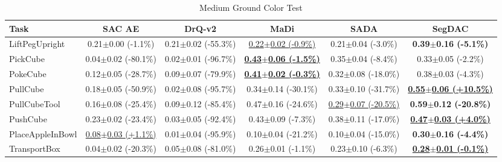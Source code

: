\begin{table}[htbp]
\centering
\scriptsize
\caption{Medium Ground Color Test}
\label{tab:appendix_groundcolortest_medium}
\begin{adjustbox}{max width=\textwidth}
\begin{tabular}{l*{5}{c}}
\toprule
\textbf{Task} & \textbf{SAC AE} & \textbf{DrQ-v2} & \textbf{MaDi} & \textbf{SADA} & \textbf{SegDAC} \\
\midrule
LiftPegUpright & 0.21$\pm$0.00 \scriptsize{(-1.1\%)} & 0.21$\pm$0.02 \scriptsize{(-55.3\%)} & \underline{0.22$\pm$0.02 \scriptsize{(-0.9\%)}} & 0.21$\pm$0.04 \scriptsize{(-3.0\%)} & \textbf{0.39$\pm$0.16 \scriptsize{(-5.1\%)}} \\
PickCube & 0.04$\pm$0.02 \scriptsize{(-80.1\%)} & 0.02$\pm$0.01 \scriptsize{(-96.7\%)} & \textbf{\underline{0.43$\pm$0.06 \scriptsize{(-1.5\%)}}} & 0.35$\pm$0.04 \scriptsize{(-8.4\%)} & 0.33$\pm$0.05 \scriptsize{(-2.2\%)} \\
PokeCube & 0.12$\pm$0.05 \scriptsize{(-28.7\%)} & 0.09$\pm$0.07 \scriptsize{(-79.9\%)} & \textbf{\underline{0.41$\pm$0.02 \scriptsize{(-0.3\%)}}} & 0.32$\pm$0.08 \scriptsize{(-18.0\%)} & 0.38$\pm$0.03 \scriptsize{(-4.3\%)} \\
PullCube & 0.18$\pm$0.05 \scriptsize{(-50.9\%)} & 0.02$\pm$0.08 \scriptsize{(-95.7\%)} & 0.34$\pm$0.14 \scriptsize{(-30.1\%)} & 0.33$\pm$0.10 \scriptsize{(-31.7\%)} & \textbf{\underline{0.55$\pm$0.06 \scriptsize{(+10.5\%)}}} \\
PullCubeTool & 0.16$\pm$0.08 \scriptsize{(-25.4\%)} & 0.09$\pm$0.12 \scriptsize{(-85.4\%)} & 0.47$\pm$0.16 \scriptsize{(-24.6\%)} & \underline{0.29$\pm$0.07 \scriptsize{(-20.5\%)}} & \textbf{0.59$\pm$0.12 \scriptsize{(-20.8\%)}} \\
PushCube & 0.23$\pm$0.02 \scriptsize{(-23.4\%)} & 0.03$\pm$0.05 \scriptsize{(-92.4\%)} & 0.43$\pm$0.09 \scriptsize{(-7.3\%)} & 0.38$\pm$0.11 \scriptsize{(-17.0\%)} & \textbf{\underline{0.47$\pm$0.03 \scriptsize{(+4.0\%)}}} \\
PlaceAppleInBowl & \underline{0.08$\pm$0.03 \scriptsize{(+1.1\%)}} & 0.01$\pm$0.04 \scriptsize{(-95.9\%)} & 0.10$\pm$0.04 \scriptsize{(-21.2\%)} & 0.10$\pm$0.04 \scriptsize{(-15.0\%)} & \textbf{0.30$\pm$0.16 \scriptsize{(-4.4\%)}} \\
TransportBox & 0.04$\pm$0.02 \scriptsize{(-20.3\%)} & 0.05$\pm$0.08 \scriptsize{(-81.0\%)} & 0.26$\pm$0.01 \scriptsize{(-1.1\%)} & 0.23$\pm$0.10 \scriptsize{(-6.3\%)} & \textbf{\underline{0.28$\pm$0.01 \scriptsize{(-0.1\%)}}} \\
\bottomrule
\end{tabular}
\end{adjustbox}
\end{table}

